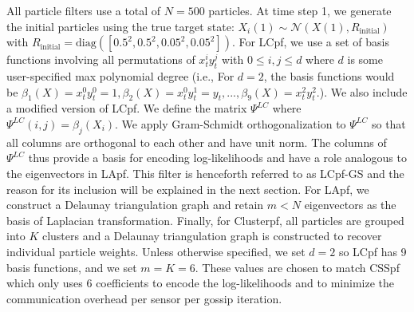 \documentclass[10pt,letterpaper,final]{article}
\begin{document}

All particle filters use a total of $N=500$ particles. At time step 1, we generate the initial particles using the true target state: $X_i(1) \sim \mathcal{N}(X(1), R_{\text{initial}})$ with $R_{\text{initial}}=\text{diag}([0.5^2,0.5^2,0.05^2,0.05^2])$. For LCpf, we use a set of basis functions involving all permutations of $x_t^iy_t^j$ with $0\leq i, j \leq d$ where $d$ is some user-specified max polynomial degree (i.e., For $d=2$, the basis functions would be $\beta_1(X) = x_t^0 y_t^0 = 1, \beta_2(X) = x_t^0 y_t^1 = y_t, ..., \beta_9(X) = x_t^2 y_t^2 $.). We also include a modified version of LCpf. We define the matrix $\Psi^{LC}$ where $\Psi^{LC}(i,j)=\beta_j(X_i)$. We apply Gram-Schmidt orthogonalization to $\Psi^{LC}$ so that all columns are orthogonal to each other and have unit norm. The columns of $\Psi^{LC}$ thus provide a basis for encoding log-likelihoods and have a role analogous to the eigenvectors in LApf. This filter is henceforth referred to as LCpf-GS and the reason for its inclusion will be explained in the next section. For LApf, we construct a Delaunay triangulation graph and retain $m<N$ eigenvectors as the basis of Laplacian transformation. Finally, for Clusterpf, all particles are grouped into $K$ clusters and a Delaunay triangulation graph is constructed to recover individual particle weights. Unless otherwise specified, we set $d=2$ so LCpf has 9 basis functions, and we set $m=K=6$. These values are chosen to match CSSpf which only uses 6 coefficients to encode the log-likelihoods and to minimize the communication overhead per sensor per gossip iteration. 
\end{document}
